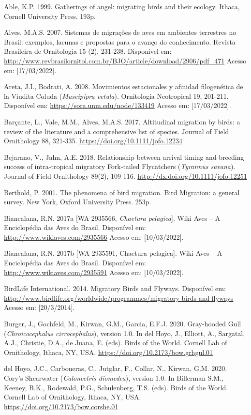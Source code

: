 \documentclass[
  oneside]{scrbook}
\begin{document}
Able, K.P. 1999. Gatherings of angel: migrating birds and their ecology. Ithaca, Cornell University Press. 193p.

Alves, M.A.S. 2007. Sistemas de migrações de aves em ambientes terrestres no Brasil: exemplos, lacunas e propostas para o avanço do conhecimento. Revista Brasileira de Ornitologia 15 (2), 231-238. Disponível em: \url{http://www.revbrasilornitol.com.br/BJO/article/download/2906/pdf_471} Acesso em: {[}17/03/2022{]}.

Areta, J.I., Bodrati, A. 2008. Movimientos estacionales y afinidad filogenética de la Viudita Coluda (\emph{Muscipipra vetula}). Ornitología Neotropical 19, 201-211. Disponível em: \url{https://sora.unm.edu/node/133419} Acesso em: {[}17/03/2022{]}.

Barçante, L., Vale, M.M., Alves, M.A.S. 2017. Altitudinal migration by birds: a review of the literature and a comprehensive list of species. Journal of Field Ornithology 88, 321-335. \url{https://doi.org/10.1111/jofo.12234}

Bejarano, V., Jahn, A.E. 2018. Relationship between arrival timing and breeding success of intra‐tropical migratory Fork‐tailed Flycatchers (\emph{Tyrannus savana}). Journal of Field Ornithology 89(2), 109-116. \url{http://dx.doi.org/10.1111/jofo.12251}

Berthold, P. 2001. The phenomena of bird migration. Bird Migration: a general survey. New York, Oxford University Press. 253p.

Biancalana, R.N. 2017a {[}WA 2935566, \emph{Chaetura pelagica}{]}. Wiki Aves -- A Enciclopédia das Aves do Brasil. Disponível em: \url{http://www.wikiaves.com/2935566} Acesso em: {[}10/03/2022{]}.

Biancalana, R.N. 2017b {[}WA 2935591, Chaetura pelagica{]}. Wiki Aves -- A Enciclopédia das Aves do Brasil. Disponível em: \url{http://www.wikiaves.com/2935591} Acesso em: {[}10/03/2022{]}.

BirdLife International. 2014. Migratory Birds and Flyways. Disponível em: \url{http://www.birdlife.org/worldwide/programmes/migratory-birds-and-flyways} Acesso em: {[}20/3/2014{]}.

Burger, J., Gochfeld, M., Kirwan, G.M., Garcia, E.F.J. 2020. Gray-hooded Gull (\emph{Chroicocephalus cirrocephalus}), version 1.0. In del Hoyo, J., Elliott, A., Sargatal, A.J., Christie, D.A., de Juana, E. (eds). Birds of the World. Cornell Lab of Ornithology, Ithaca, NY, USA. \url{https://doi.org/10.2173/bow.grhgul.01}

del Hoyo, J.C., Carboneras, C., Jutglar, F., Collar, N., Kirwan, G.M. 2020. Cory's Shearwater (\emph{Calonectris diomedea}), version 1.0. In Billerman S.M., Keeney, B.K., Rodewald, P.G., Schulenberg, T.S. (eds). Birds of the World. Cornell Lab of Ornithology, Ithaca, NY, USA. \url{https://doi.org/10.2173/bow.corshe.01}
\end{document}
